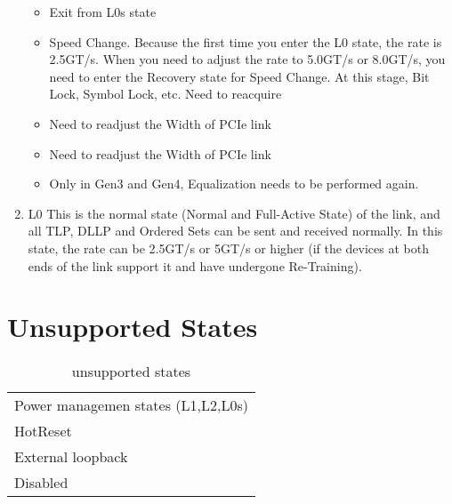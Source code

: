 \begin{enumerate}
\begin{itemize}
    \item  Exit from L0s state
    \item Speed Change. Because the first time you enter the L0 state, the rate is 2.5GT/s. When you need to adjust the rate to 5.0GT/s or 8.0GT/s, you need to enter the Recovery state for Speed Change. At this stage, Bit Lock, Symbol Lock, etc. Need to reacquire
    \item Need to readjust the Width of PCIe link
    \item Need to readjust the Width of PCIe link
    \item Only in Gen3 and Gen4, Equalization needs to be performed again.
\end{itemize}
    \item L0 \newline 
    This is the normal state (Normal and Full-Active State) of the link, and all TLP, DLLP and Ordered Sets can be sent and received normally. In this state, the rate can be 2.5GT/s or 5GT/s or higher (if the devices at both ends of the link support it and have undergone Re-Training).
    

\end{enumerate}



\section{Unsupported States}
\begin{table}[H]
    \caption{unsupported states}
    \centering
  \begin{tabular}{ |m{50mm}|}
\hline
\rowcolor{Gray}
\multicolumn{1}{|c|}{\textbf{
Unsupported States
} } \\
\hline

Power managemen states (L1,L2,L0s) \\ \hline 
HotReset \\ \hline
External loopback\\ \hline
Disabled\\ \hline

\end{tabular}

\end{table}


